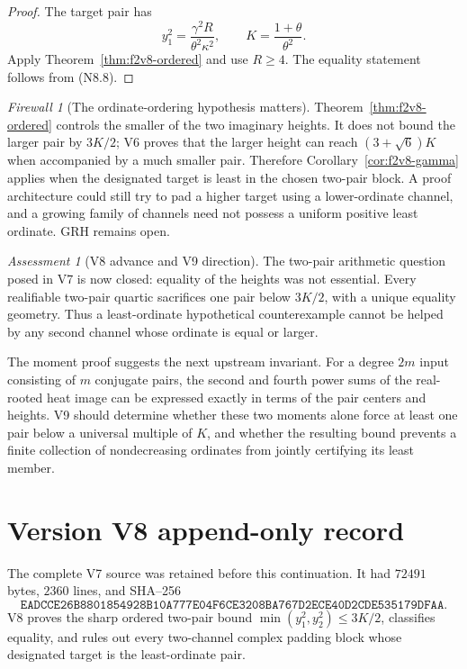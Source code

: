 \documentclass[11pt]{article}
\theoremstyle{definition}
\theoremstyle{remark}
\newtheorem{assessment}[theorem]{Assessment}
\newtheorem{firewall}[theorem]{Firewall}
\begin{document}
\begin{proof}
The target pair has
\[
 y_1^2=\frac{\gamma^2R}{\theta^2\kappa^2},
 \qquad
 K=\frac{1+\theta}{\theta^2}.
 \tag{N8.20}
\]
Apply Theorem~\ref{thm:f2v8-ordered} and use \(R\ge4\).
The equality statement follows from \textup{(N8.8)}.
\end{proof}

\begin{firewall}[The ordinate-ordering hypothesis matters]
Theorem~\ref{thm:f2v8-ordered} controls the smaller of the two imaginary
heights.  It does not bound the larger pair by \(3K/2\); V6 proves that the
larger height can reach \((3+\sqrt6)K\) when accompanied by a much smaller
pair.  Therefore Corollary~\ref{cor:f2v8-gamma} applies when the designated
target is least in the chosen two-pair block.  A proof architecture could
still try to pad a higher target using a lower-ordinate channel, and a
growing family of channels need not possess a uniform positive least
ordinate.  GRH remains open.
\end{firewall}

\begin{assessment}[V8 advance and V9 direction]
The two-pair arithmetic question posed in V7 is now closed: equality of the
heights was not essential.  Every realifiable two-pair quartic sacrifices
one pair below \(3K/2\), with a unique equality geometry.  Thus a
least-ordinate hypothetical counterexample cannot be helped by any second
channel whose ordinate is equal or larger.

The moment proof suggests the next upstream invariant.  For a degree
\(2m\) input consisting of \(m\) conjugate pairs, the second and fourth
power sums of the real-rooted heat image can be expressed exactly in terms
of the pair centers and heights.  V9 should determine whether these two
moments alone force at least one pair below a universal multiple of \(K\),
and whether the resulting bound prevents a finite collection of
nondecreasing ordinates from jointly certifying its least member.
\end{assessment}

\section*{Version V8 append-only record}
The complete V7 source was retained before this continuation.  It had
\(72491\) bytes, \(2360\) lines, and SHA--256
\[
 \texttt{EADCCE26B8801854928B10A777E04F6CE3208BA767D2ECE40D2CDE535179DFAA}.
\]
V8 proves the sharp ordered two-pair bound
\(\min(y_1^2,y_2^2)\le3K/2\), classifies equality, and rules out every
two-channel complex padding block whose designated target is the
least-ordinate pair.
\end{document}
